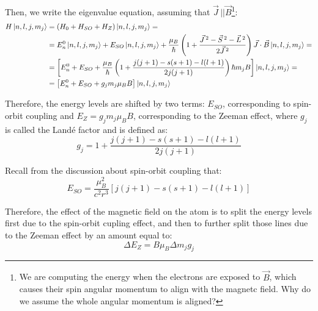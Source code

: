Then, we write the eigenvalue equation, assuming that $\vec{J}\,||\vec{B}$\footnote{\color{red}We are computing the energy when the electrons are exposed to $\vec{B}$, which causes their spin angular momentum to align with the magnetc field. Why do we assume the whole angular momentum is aligned?}:
\begin{equation}
    \begin{split}
        H\ket{n,l,j,m_j} &= (H_0+H_{SO}+H_Z)\ket{n,l,j,m_j} =\\
        &= E_n^0\ket{n,l,j,m_j} + E_{SO}\ket{n,l,j,m_j} + \frac{\mu_B}{\hbar} \left(1+ \frac{\vec{J}\,^2 - \vec{S}\,^2 - \vec{L}\,^2}{2\vec{J}\,^2}\right)\vec{J}\cdot \vec{B} \ket{n,l,j,m_j} = \\
        &= \left[ E_n^0 + E_{SO} + \frac{\mu_B}{\hbar}\left(1+\frac{j(j+1)-s(s+1)-l(l+1)}{2j(j+1)}\right)\hbar m_jB\right]\ket{n,l,j,m_j}=\\
        &= \left[E_n^0 + E_{SO} + g_jm_j\mu_B B\right]\ket{n,l,j,m_j}
    \end{split}
\end{equation}

Therefore, the energy levels are shifted by two terms: $E_{SO}$, corresponding to spin-orbit coupling and $E_Z = g_jm_j\mu_B B$, corresponding to the Zeeman effect, where $g_j$ is called the Landé factor and is defined as:
\begin{equation}
    g_j = 1 + \frac{j(j+1) - s(s+1)-l(l+1)}{2j(j+1)}
\end{equation}

Recall from the discussion about spin-orbit coupling that:
\begin{equation}
    E_{SO} = \frac{\mu_B^2}{c^2r^3} \left[j(j+1)-s(s+1)-l(l+1)\right]
\end{equation}

Therefore, the effect of the magnetic field on the atom is to split the energy levels first due to the spin-orbit cupling effect, and then to further split those lines due to the Zeeman effect by an amount equal to:
\begin{equation}
    \Delta E_Z = B\mu_B\Delta m_jg_j
\end{equation}

